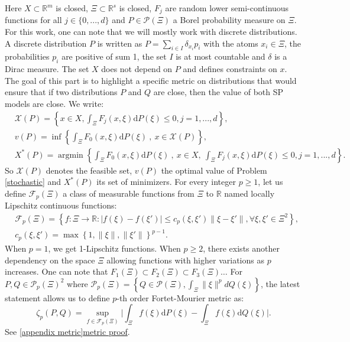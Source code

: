 \documentclass{amsart}
\newcommand{\argmin}{\mathop{\arg\min}}
\newcommand{\RR}{\mathbb{R}}
\begin{document}
Here $X\subset\RR^m$ is closed, $\Xi\subset\RR^s$ is closed, $F_j$ are random lower semi-continuous functions for all $j\in\{0,...,d\}$ and $P\in\mathcal{P}\left(\Xi\right)$ a Borel probability measure on $\Xi$. For this work, one can note that we will mostly work with discrete distributions. A discrete distribution $P$ is written as $P=\sum_{i\in I}\delta_{x_i}p_i$ with the atoms $x_i\in\Xi$, the probabilities $p_i$ are positive of sum 1, the set $I$ is at most countable and $\delta$ is a Dirac measure. The set $X$ does not depend on $P$ and defines constraints on $x$. The goal of this part is to highlight a specific metric on distributions that would ensure that if two distributions $P$ and $Q$ are close, then the value of both SP models are close. We write:
\begin{align*}
    &\mathcal{X}\left(P\right)=\left\{x\in X, \int_\Xi F_j\left(x,\xi\right)\text{d}P\left(\xi\right)\leq0, j=1,...,d\right\},\\
    &v\left(P\right)=\inf\left\{\int_\Xi F_0\left(x,\xi\right)\text{d}P\left(\xi\right)\:,\: x\in \mathcal{X}\left(P\right)\right\}, \\
    &X^*\left(P\right)=\argmin\left\{\int_\Xi F_0\left(x,\xi\right)\text{d}P\left(\xi\right)\:,\: x\in X, \: \int_\Xi F_j\left(x,\xi\right)\text{d}P\left(\xi\right)\leq0, j=1,...,d\right\}.
\end{align*}
So $\mathcal{X}\left(P\right)$ denotes the feasible set, $v\left(P\right)$ the optimal value of Problem \eqref{stochastic} and $X^*\left(P\right)$ its set of minimizers. For every integer $p\geq 1$, let us define $\mathcal{F}_p\left(\Xi\right)$ a class of measurable functions from $\Xi$ to $\RR$ named locally Lipschitz continuous functions:
\begin{align*}
    &\mathcal{F}_p\left(\Xi\right)=\left\{f:\Xi\to \RR: \lvert f\left(\xi\right)-f\left(\xi'\right)\rvert \leq c_p\left(\xi,\xi'\right)\lVert\xi-\xi'\rVert, \forall \xi,\xi'\in \Xi^2 \right\}, \\
   & c_p\left(\xi,\xi'\right)=\max \left\{1,\lVert\xi \rVert,\lVert\xi'\rVert\right\}^{p-1}.
\end{align*}
When $p=1$, we get 1-Lipschitz functions. When $p\geq 2$, there exists another dependency on the space $\Xi$ allowing functions with higher variations as $p$ increases. One can note that $F_1\left(\Xi\right)\subset F_2\left(\Xi\right)\subset F_3\left(\Xi\right) \hdots$ For $P,Q\in\mathcal{P}_p\left(\Xi\right)^2$ where $\mathcal{P}_p\left(\Xi\right)=\left\{Q\in\mathcal{P}\left(\Xi\right), \int_\Xi \lVert\xi\rVert^pdQ\left(\xi\right)\right\}$, the latest statement allows us to define $p$-th order Fortet-Mourier metric as:
$$
\zeta_p\left(P,Q\right)=\sup_{f\in\mathcal{F}_p\left(\Xi\right)}\lvert \int_\Xi f\left(\xi\right)\text{d}P\left(\xi\right)-\int_\Xi f\left(\xi\right)\text{d}Q\left(\xi\right)\rvert.
$$
See \ref{appendix metric}\href{https://www.imo.universite-paris-saclay.fr/~pierre-loic.meliot/master/exam-2017.pdf}{metric proof}.
\end{document}
